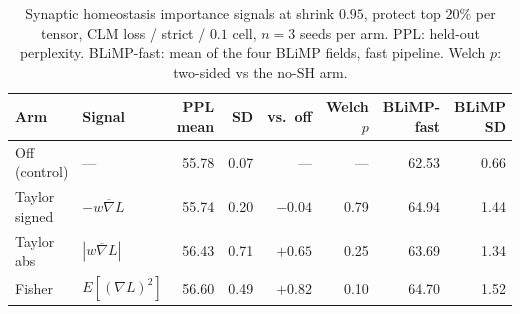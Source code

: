 \begin{table}[h]
\centering
\small
\begin{tabular}{llrrrrrr}
\toprule
\textbf{Arm} & \textbf{Signal} & \textbf{PPL mean} & \textbf{SD} & \textbf{vs.\ off} & \textbf{Welch $p$} & \textbf{BLiMP-fast} & \textbf{BLiMP SD} \\
\midrule
Off (control) & — & 55.78 & 0.07 & — & — & 62.53 & 0.66 \\
Taylor signed & $-\overline{w \nabla L}$ & 55.74 & 0.20 & $-0.04$ & 0.79 & 64.94 & 1.44 \\
Taylor abs & $|\overline{w \nabla L}|$ & 56.43 & 0.71 & $+0.65$ & 0.25 & 63.69 & 1.34 \\
Fisher & $E[(\nabla L)^2]$ & 56.60 & 0.49 & $+0.82$ & 0.10 & 64.70 & 1.52 \\
\bottomrule
\end{tabular}
\caption{Synaptic homeostasis importance signals at shrink $0.95$, protect top $20\%$ per tensor, CLM loss / strict / \replayratio $0.1$ cell, $n=3$ seeds per arm. PPL: held-out perplexity. BLiMP-fast: mean of the four BLiMP fields, fast pipeline. Welch $p$: two-sided vs the no-SH arm.}
\label{tab:sh-arms}
\end{table}
